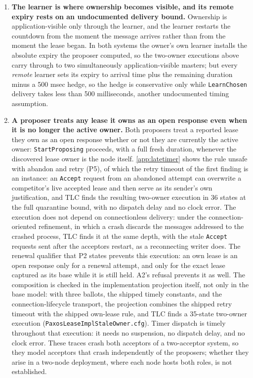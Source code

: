 \documentclass[final,5p,times,twocolumn,number]{elsarticle}
\newcommand{\code}[1]{\texttt{#1}}
\begin{document}
\begin{enumerate}
\item \textbf{The learner is where ownership becomes visible, and its remote expiry rests on an undocumented delivery bound.}  Ownership is application-visible only through the learner, and the learner restarts the countdown from the moment the message arrives rather than from the moment the lease began.  In both systems the owner's own learner installs the absolute expiry the proposer computed, so the two-owner executions above carry through to two simultaneously application-visible masters; but every \emph{remote} learner sets its expiry to arrival time plus the remaining duration minus a 500 msec hedge, so the hedge is conservative only while \code{LearnChosen} delivery takes less than 500 milliseconds, another undocumented timing assumption.
\item \textbf{A proposer treats any lease it owns as an open response even when it is no longer the active owner.}  Both proposers treat a reported lease they own as an open response whether or not they are currently the active owner: \code{StartProposing} proceeds, with a full fresh duration, whenever the discovered lease owner is the node itself.  \ref{app:latetimer} shows the rule unsafe with abandon and retry (P5), of which the retry timeout of the first finding is an instance: an \code{Accept} request from an abandoned attempt can overwrite a competitor's live accepted lease and then serve as its sender's own justification, and TLC finds the resulting two-owner execution in 36 states at the full quarantine bound, with no dispatch delay and no clock error.  The execution does not depend on connectionless delivery: under the connection-oriented refinement, in which a crash discards the messages addressed to the crashed process, TLC finds it at the same depth, with the stale \code{Accept} requests sent after the acceptors restart, as a reconnecting writer does.  The renewal qualifier that P2 states prevents this execution: an own lease is an open response only for a renewal attempt, and only for the exact lease captured as its base while it is still held.  A2's refusal prevents it as well.  The composition is checked in the implementation projection itself, not only in the base model: with three ballots, the shipped timely constants, and the connection-lifecycle transport, the projection combines the shipped retry timeout with the shipped own-lease rule, and TLC finds a 35-state two-owner execution (\code{PaxosLeaseImplStaleOwner.cfg}).  Timer dispatch is timely throughout that execution: it needs no suspension, no dispatch delay, and no clock error.  These traces crash both acceptors of a two-acceptor system, so they model acceptors that crash independently of the proposers; whether they arise in a two-node deployment, where each node hosts both roles, is not established.

\end{enumerate}
\end{document}

